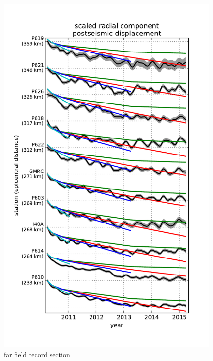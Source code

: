 \documentclass[12pt]{article}
\begin{document}
\begin{figure}
\includegraphics[scale=0.9]{Figures/far_field_record_section}
\centering 
\caption{far field record section}
\label{FarFieldRS}
\end{figure}        
\end{document}
